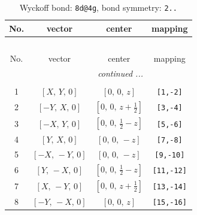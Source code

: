 \documentclass[fleqn,8pt]{jsarticle}
\begin{document}
\begin{longtable}{cccc}
\caption{Wyckoff bond: {\tt 8d@4g}, bond symmetry: {\tt 2..}}
 \\
 \hline \hline
No. & vector & center & mapping \\ \hline \endfirsthead

\multicolumn{3}{l}{\tablename\ \thetable{}} \\
 \hline \hline
No. & vector & center & mapping \\ \hline \endhead

 \hline \hline
\multicolumn{3}{r}{\footnotesize\it continued ...} \\ \endfoot

 \hline \hline
\multicolumn{3}{r}{} \\ \endlastfoot

1 & $\left[ X,\, Y,\, 0 \right]$ & $\left[ 0,\, 0,\, z \right]$ & {\tt [1,-2]} \\ \hline
2 & $\left[ - Y,\, X,\, 0 \right]$ & $\left[ 0,\, 0,\, z + \frac{1}{2} \right]$ & {\tt [3,-4]} \\ \hline
3 & $\left[ - X,\, Y,\, 0 \right]$ & $\left[ 0,\, 0,\, \frac{1}{2} - z \right]$ & {\tt [5,-6]} \\ \hline
4 & $\left[ Y,\, X,\, 0 \right]$ & $\left[ 0,\, 0,\, - z \right]$ & {\tt [7,-8]} \\ \hline
5 & $\left[ - X,\, - Y,\, 0 \right]$ & $\left[ 0,\, 0,\, - z \right]$ & {\tt [9,-10]} \\ \hline
6 & $\left[ Y,\, - X,\, 0 \right]$ & $\left[ 0,\, 0,\, \frac{1}{2} - z \right]$ & {\tt [11,-12]} \\ \hline
7 & $\left[ X,\, - Y,\, 0 \right]$ & $\left[ 0,\, 0,\, z + \frac{1}{2} \right]$ & {\tt [13,-14]} \\ \hline
8 & $\left[ - Y,\, - X,\, 0 \right]$ & $\left[ 0,\, 0,\, z \right]$ & {\tt [15,-16]} \\
\end{longtable}
\renewcommand{\arraystretch}{1.2}
\end{document}
